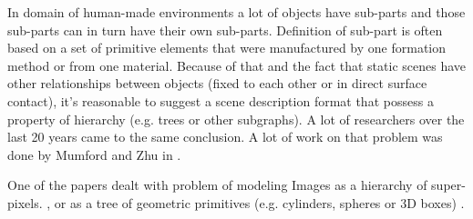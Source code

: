 

%



In domain of human-made environments a lot of objects have sub-parts and those sub-parts can in turn have their own sub-parts. Definition of sub-part is often based on a set of primitive elements that were manufactured by one formation method or from one material. Because of that and the fact that static scenes have other relationships between objects (fixed to each other or in direct surface contact), it's reasonable to suggest a scene description format that possess a property of hierarchy (e.g. trees or other subgraphs).
A lot of researchers over the last 20 years came to the same conclusion. A lot of work on that problem was done by Mumford and Zhu in \cite{zhu2006stochastic}.

One of the papers dealt with problem of modeling Images as a hierarchy of super-pixels. \cite{russell2009associative}, or as a tree of geometric primitives (e.g. cylinders, spheres or 3D boxes) \cite{li2017grass}.




